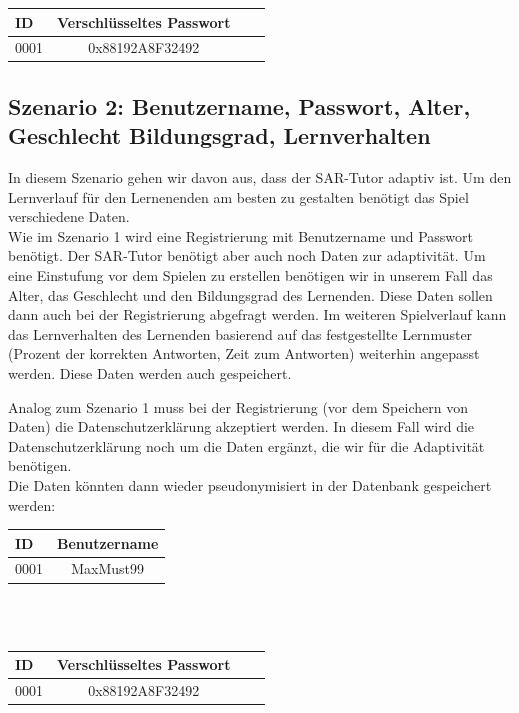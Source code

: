 \documentclass[a4paper, 12pt]{article}
\begin{document}
\begin{tabular}{lcrr}
	
	ID & Verschlüsseltes Passwort\\
	\hline
	0001 & 0x88192A8F32492
	
\end{tabular}
\newpage
\subsection{Szenario 2: Benutzername, Passwort, Alter, Geschlecht Bildungsgrad, Lernverhalten}

In diesem Szenario gehen wir davon aus, dass der SAR-Tutor adaptiv ist. Um den Lernverlauf für den Lernenenden am besten zu gestalten benötigt das Spiel verschiedene Daten.\\

Wie im Szenario 1 wird eine Registrierung mit Benutzername und Passwort benötigt. Der SAR-Tutor benötigt aber auch noch Daten zur adaptivität. Um eine Einstufung vor dem Spielen zu erstellen benötigen wir in unserem Fall das Alter, das Geschlecht und den Bildungsgrad des Lernenden. Diese Daten sollen dann  auch bei der Registrierung abgefragt werden. 
Im weiteren Spielverlauf kann das Lernverhalten des Lernenden basierend auf das festgestellte Lernmuster (Prozent der korrekten Antworten, Zeit zum Antworten) weiterhin angepasst werden. Diese Daten werden auch gespeichert.

Analog zum Szenario 1 muss bei der Registrierung (vor dem Speichern von Daten) die Datenschutzerklärung akzeptiert werden. In diesem Fall wird die Datenschutzerklärung noch um die Daten ergänzt, die wir für die Adaptivität benötigen.\\

Die Daten könnten dann wieder pseudonymisiert in der Datenbank gespeichert werden:\\

\begin{tabular}{lc}
	
	ID & Benutzername \\
	\hline
	0001 & MaxMust99
	
\end{tabular}\\\\

\begin{tabular}{lcrr}
	
	ID & Verschlüsseltes Passwort\\
	\hline
	0001 & 0x88192A8F32492
	
\end{tabular}\\\\
\end{document}
